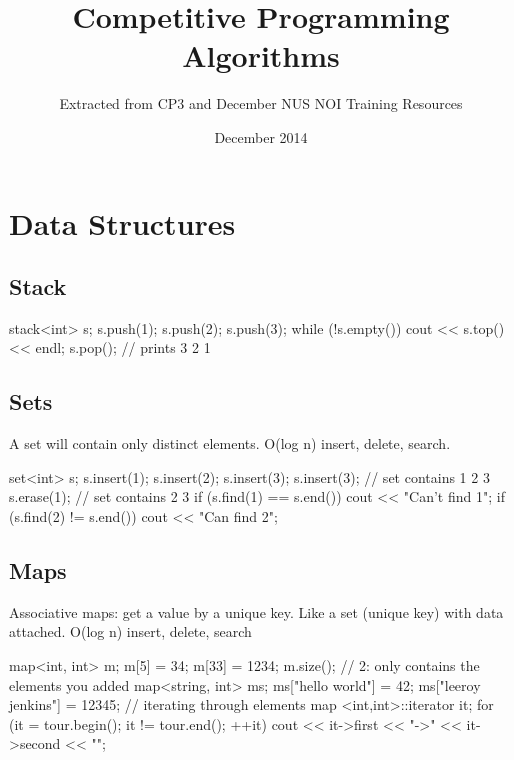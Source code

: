 \documentclass{article}
\title{Competitive Programming Algorithms}
\author{Extracted from CP3 and December NUS NOI Training Resources}
\date{December 2014}
\begin{document}
\maketitle

\section{Data Structures}
\subsection{Stack}
\begin{mylisting}{}
stack<int> s;
s.push(1); s.push(2); s.push(3);
while (!s.empty()) {
    cout << s.top() << endl;
    s.pop();
} // prints 3 2 1
\end{mylisting}

\subsection{Sets}
A set will contain only distinct elements. O(log n) insert, delete, search.
\begin{mylisting}{}
set<int> s;
s.insert(1); s.insert(2); s.insert(3); s.insert(3); // set contains 1 2 3
s.erase(1);                                         // set contains 2 3
if (s.find(1) == s.end()) cout << "Can't find 1\n";
if (s.find(2) != s.end()) cout << "Can find 2\n";
\end{mylisting}

\subsection{Maps}
Associative maps: get a value by a unique key. Like a set (unique key) with data attached. O(log n) insert, delete, search
\begin{mylisting}{}
map<int, int> m;
m[5] = 34; m[33] = 1234;
m.size(); // 2: only contains the elements you added
map<string, int> ms;
ms["hello world"] = 42;
ms["leeroy jenkins"] = 12345;
// iterating through elements
map <int,int>::iterator it;
for (it = tour.begin(); it != tour.end(); ++it){
	cout << it->first << "->" << it->second << "\n";
}
\end{mylisting}
\end{document}
